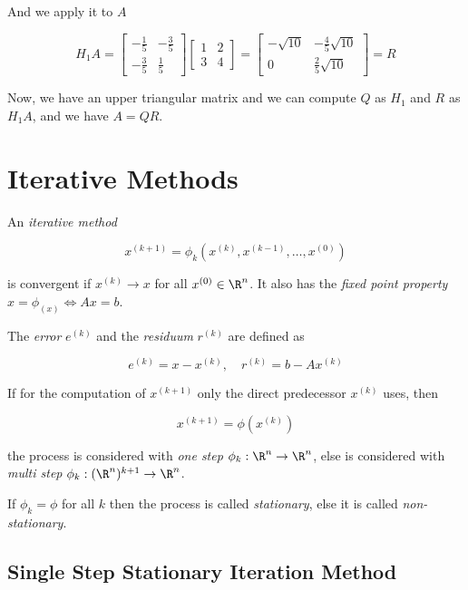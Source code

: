 And we apply it to \(A\)

\[
    H_1 A = 
    \begin{bmatrix}
        -\frac{1}{5} & -\frac{3}{5} \\ 
        -\frac{3}{5} & \frac{1}{5}
    \end{bmatrix}
    \begin{bmatrix}
        1 & 2 \\ 
        3 & 4
    \end{bmatrix}
    =
    \begin{bmatrix}
        -\sqrt{10} & -\frac{4}{5}\sqrt{10} \\ 
        0 & \frac{2}{5}\sqrt{10}
    \end{bmatrix}
    = R
\]

Now, we have an upper triangular matrix and we can compute \(Q\) as \(H_1\) and \(R\) as \(H_1 A\), and we have \(A = QR\).

\section{Iterative Methods}

An \emph{iterative method} 

\[
    x^{(k + 1)} = \phi_k(x^{(k)}, x^{(k - 1)}, \dots, x^{(0)})
\]

is convergent if \(x^{(k)} \to x\) for all  \(x^{(0)} \in \R^n\). It also has the \emph{fixed point property} 
\(x = \phi_(x) \iff Ax = b\).

The \emph{error} \(e^{(k)}\) and the \emph{residuum} \(r^{(k)}\) are defined as

\[
    e^{(k)} = x - x^{(k)}, \quad r^{(k)} = b - Ax^{(k)}
\]

If for the computation of \(x^{(k + 1)}\) only the direct predecessor \(x^{(k)}\) uses, then

\[
    x^{(k + 1)} = \phi(x^{(k)})
\]

the process is considered with \emph{one step} \(\phi_k : \R^n \to \R^n\), else is considered with \emph{multi step} 
\(\phi_k : (\R^n)^{k + 1} \to \R^n\).

If \(\phi_k = \phi\) for all \(k\) then the process is called \emph{stationary}, else it is called \emph{non-stationary}.

\subsection{Single Step Stationary Iteration Method}


